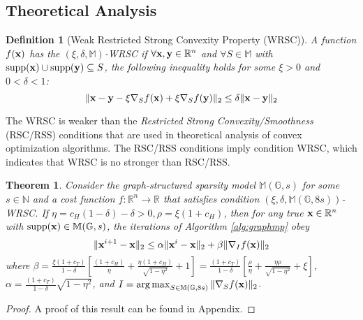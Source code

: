 \documentclass{article}
\DeclareMathOperator*{\argmax}{arg\,max}
\newtheorem{theorem}{Theorem}
\newtheorem{definition}{Definition}
\begin{document}
\subsection{Theoretical Analysis}

\begin{definition}[Weak Restricted Strong Convexity Property (WRSC)]
A function $f({\bf x})$ has the $(\xi,\delta,\mathbb{M})$-WRSC if $\forall {\bf x},{\bf y}\in\mathbb{R}^n$ and $\forall S\in\mathbb{M}$ with $\mathrm{supp}({\bf x})\cup\mathrm{supp}({\bf y})\subseteq S$, the following inequality holds for some $\xi>0$ and $0<\delta<1$:
\begin{equation}
\|{\bf x}-{\bf y}-\xi \nabla_{S}f({\bf x})+\xi \nabla_S f({\bf y})\|_2\leq \delta\|{\bf x}-{\bf y}\|_2
\end{equation}
\end{definition}
The WRSC is weaker than the \textit{Restricted Strong Convexity/Smoothness} (RSC/RSS) conditions that are used in theoretical analysis of convex optimization algorithms. The RSC/RSS conditions imply condition WRSC, which indicates that WRSC is no stronger than RSC/RSS.

\begin{theorem}\label{thm:mp:converge}
Consider the graph-structured sparsity model $\mathbb{M}(\mathbb{G},s)$ for some $s\in\mathbb{N}$ and a cost function $f:\mathbb{R}^n\to\mathbb{R}$ that satisfies condition $(\xi,\delta,\mathbb{M}(\mathbb{G},8s))$-WRSC. If $\eta=c_H(1-\delta)-\delta>0,\rho=\xi(1+c_H)$, then for any true ${\bf x}\in\mathbb{R}^n$ with $\mathrm{supp}({\bf x})\in\mathbb{M}(\mathbb{G},s)$, the iterations of Algorithm \ref{alg:graphmp} obey
\begin{equation}
\|{\bf x}^{i+1}-{\bf x}\|_2\leq\alpha\|{\bf x}^i-{\bf x}\|_2+\beta\|\nabla_I f({\bf x})\|_2
\end{equation}
where $\beta=\frac{\xi(1+c_T)}{1-\delta}\left[\frac{(1+c_H)}{\eta}+\frac{\eta(1+c_H)}{\sqrt{1-\eta^2}}+1 \right]=\frac{(1+c_T)}{1-\delta}\left[\frac{\rho}{\eta}+\frac{\eta\rho}{\sqrt{1-\eta^2}}+\xi \right]$, $\alpha=\frac{(1+c_T)}{1-\delta}\sqrt{1-\eta^2}$, and $I=\argmax_{S\in\mathbb{M}(\mathbb{G},8s)}\|\nabla_S f({\bf x})\|_2$.
\end{theorem}
\begin{proof}
A proof of this result can be found in Appendix.
\end{proof}
\end{document}
